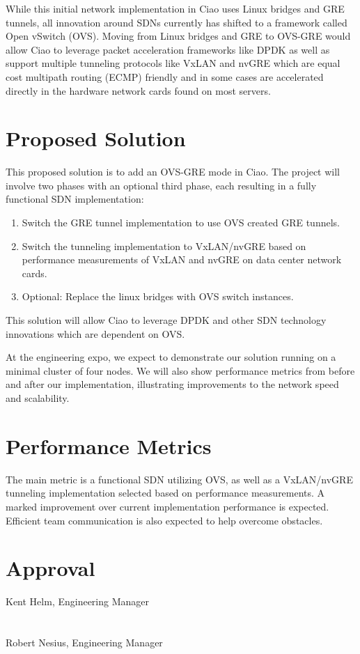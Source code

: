 \documentclass[10pt,letterpaper,onecolumn,draftclsnofoot]{IEEEtran}
\begin{document}
While this initial network implementation in Ciao uses Linux bridges and GRE
tunnels, all innovation around SDNs currently has shifted to a framework called
Open vSwitch (OVS). Moving from Linux bridges and GRE to OVS-GRE would allow
Ciao to leverage packet acceleration frameworks like DPDK as well as support
multiple tunneling protocols like VxLAN and nvGRE which are equal cost multipath
routing (ECMP) friendly and in some cases are accelerated directly in the
hardware network cards found on most servers.

\section*{Proposed Solution}
This proposed solution is to add an OVS-GRE mode in Ciao. The project will 
involve two phases with an optional third phase, each resulting in a fully 
functional SDN implementation:

\begin{enumerate}
	\item Switch the GRE tunnel implementation to use OVS created GRE 
		tunnels.
	\item Switch the tunneling implementation to VxLAN/nvGRE based on
		performance measurements of VxLAN and nvGRE on data center
		network cards.
	\item Optional: Replace the linux bridges with OVS switch instances.
\end{enumerate}
This solution will allow Ciao to leverage DPDK and other SDN technology
innovations which are dependent on OVS.

At the engineering expo, we expect to demonstrate our solution running on a
minimal cluster of four nodes. We will also show performance metrics from before
and after our implementation, illustrating improvements to the network speed and
scalability.

\section*{Performance Metrics}
The main metric is a functional SDN utilizing OVS, as well as a VxLAN/nvGRE
tunneling implementation selected based on performance measurements. A marked
improvement over current implementation performance is expected. Efficient team
communication is also expected to help overcome obstacles.

\clearpage
\section*{Approval}
\vspace{2cm}
\noindent Kent Helm, Engineering Manager\hspace{0.7cm} \makebox[1.5in]
{\hrulefill}\\\\\\
\noindent Robert Nesius, Engineering Manager\hspace{0.7cm} \makebox[1.5in]
{\hrulefill}\\\\\\
\end{document}
